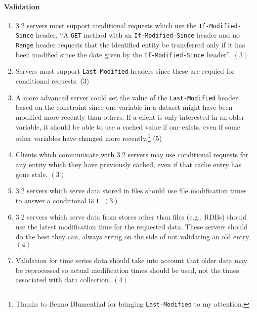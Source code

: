 \documentclass{article}
\begin{document}
\paragraph{Validation}
\begin{enumerate}
\item 3.2 servers must support conditional requests which use the
  \texttt{If-Modified-Since} header. ``A \texttt{GET} method with an
  \texttt{If-Modified-Since} header and no \texttt{Range} header requests
  that the identified entity be transferred only if it has been modified
  since the date given by the \texttt{If-Modified-Since}
  header''\cite{w3c:http}. $(3)$
\item Servers must support \texttt{Last-Modified} headers since these are
  requied for conditional requests. (3)
\item A more advanced server could set the value of the
  \texttt{Last-Modified} header based on the constraint since one variable in
  a dataset might have been modified more recently than others. If a client
  is only interested in an older variable, it should be able to use a cached
  value if one exists, even if some other variables have changed more
  recently.\footnote{Thanks to Benno Blumenthal for bringing
    \texttt{Last-Modified} to my attention.} (5)
\item Clients which communicate with 3.2 servers may use conditional requests
  for any entity which they have previously cached, even if that cache entry
  has gone stale. $(3)$
\item 3.2 servers which serve data stored in files should use file
  modification times to answer a conditional \texttt{GET}. $(3)$
\item 3.2 servers which serve data from stores other than files (e.g., RDBs)
  should use the latest modification time for the requested data. These
  servers should do the best they can, always erring on the side of not
  validating an old entry. $(4)$
\item Validation for time series data should take into account that older
  data may be reprocessed so actual modification times should be used, not
  the times associated with data collection. $(4)$
\end{enumerate}
\end{document}
